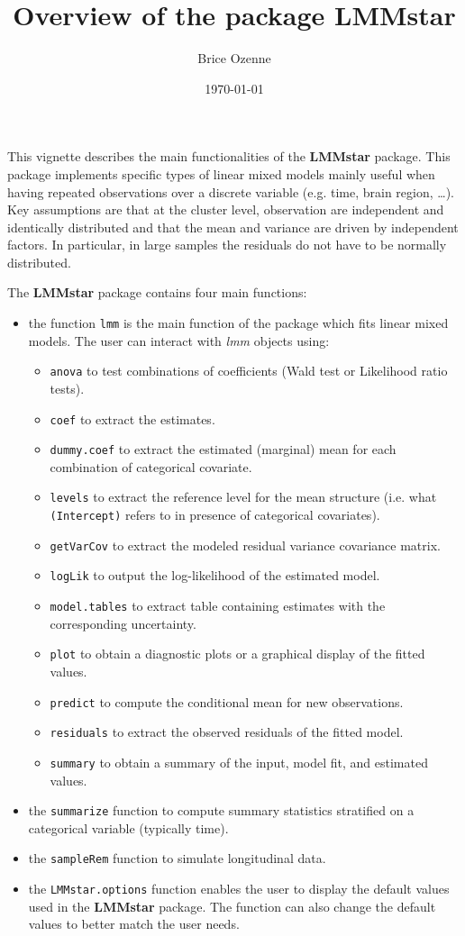 \documentclass[12pt]{article}
\author{Brice Ozenne}
\date{\today}
\title{Overview of the package LMMstar}
\begin{document}
\maketitle
This vignette describes the main functionalities of the \textbf{LMMstar}
package. This package implements specific types of linear mixed models
mainly useful when having repeated observations over a discrete
variable (e.g. time, brain region, \ldots{}). Key assumptions are that at
the cluster level, observation are independent and identically
distributed and that the mean and variance are driven by independent
factors. In particular, in large samples the residuals do not have to
be normally distributed.

\bigskip

The \textbf{LMMstar} package contains four main functions:
\begin{itemize}
\item the function \texttt{lmm} is the main function of the package which fits
linear mixed models. The user can interact with \emph{lmm} objects using:
\begin{itemize}
\item \texttt{anova} to test combinations of coefficients (Wald test or Likelihood ratio tests).
\item \texttt{coef} to extract the estimates.
\item \texttt{dummy.coef} to extract the estimated (marginal) mean for each combination of categorical covariate.
\item \texttt{levels} to extract the reference level for the mean structure
(i.e. what \texttt{(Intercept)} refers to in presence of categorical
covariates).
\item \texttt{getVarCov} to extract the modeled residual variance covariance matrix.
\item \texttt{logLik} to output the log-likelihood of the estimated model.
\item \texttt{model.tables} to extract table containing estimates with the corresponding uncertainty.
\item \texttt{plot} to obtain a diagnostic plots or a graphical display of the fitted values.
\item \texttt{predict} to compute the conditional mean for new observations.
\item \texttt{residuals} to extract the observed residuals of the fitted model.
\item \texttt{summary} to obtain a summary of the input, model fit, and estimated values.
\end{itemize}
\item the \texttt{summarize} function to compute summary statistics stratified on a categorical variable (typically time).
\item the \texttt{sampleRem} function to simulate longitudinal data.
\item the \texttt{LMMstar.options} function enables the user to display the
default values used in the \textbf{LMMstar} package. The function
can also change the default values to better match the user needs.
\end{itemize}
\end{document}

